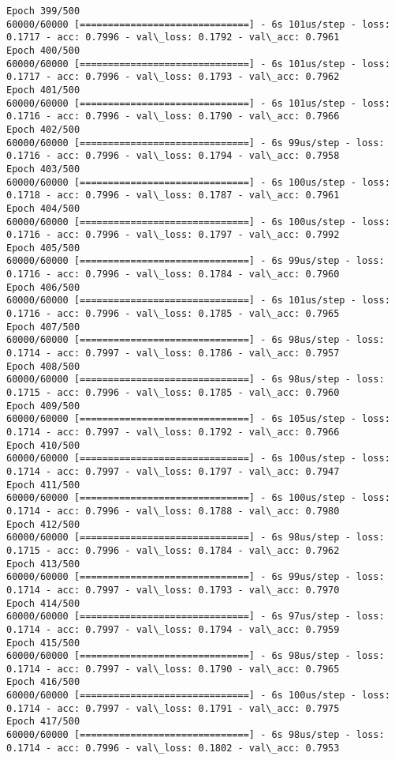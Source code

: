 \documentclass[11pt]{article}
\begin{document}
\begin{Verbatim}[commandchars=\\\{\}]
Epoch 399/500
60000/60000 [==============================] - 6s 101us/step - loss: 0.1717 - acc: 0.7996 - val\_loss: 0.1792 - val\_acc: 0.7961
Epoch 400/500
60000/60000 [==============================] - 6s 101us/step - loss: 0.1717 - acc: 0.7996 - val\_loss: 0.1793 - val\_acc: 0.7962
Epoch 401/500
60000/60000 [==============================] - 6s 101us/step - loss: 0.1716 - acc: 0.7996 - val\_loss: 0.1790 - val\_acc: 0.7966
Epoch 402/500
60000/60000 [==============================] - 6s 99us/step - loss: 0.1716 - acc: 0.7996 - val\_loss: 0.1794 - val\_acc: 0.7958
Epoch 403/500
60000/60000 [==============================] - 6s 100us/step - loss: 0.1718 - acc: 0.7996 - val\_loss: 0.1787 - val\_acc: 0.7961
Epoch 404/500
60000/60000 [==============================] - 6s 100us/step - loss: 0.1716 - acc: 0.7996 - val\_loss: 0.1797 - val\_acc: 0.7992
Epoch 405/500
60000/60000 [==============================] - 6s 99us/step - loss: 0.1716 - acc: 0.7996 - val\_loss: 0.1784 - val\_acc: 0.7960
Epoch 406/500
60000/60000 [==============================] - 6s 101us/step - loss: 0.1716 - acc: 0.7996 - val\_loss: 0.1785 - val\_acc: 0.7965
Epoch 407/500
60000/60000 [==============================] - 6s 98us/step - loss: 0.1714 - acc: 0.7997 - val\_loss: 0.1786 - val\_acc: 0.7957
Epoch 408/500
60000/60000 [==============================] - 6s 98us/step - loss: 0.1715 - acc: 0.7996 - val\_loss: 0.1785 - val\_acc: 0.7960
Epoch 409/500
60000/60000 [==============================] - 6s 105us/step - loss: 0.1714 - acc: 0.7997 - val\_loss: 0.1792 - val\_acc: 0.7966
Epoch 410/500
60000/60000 [==============================] - 6s 100us/step - loss: 0.1714 - acc: 0.7997 - val\_loss: 0.1797 - val\_acc: 0.7947
Epoch 411/500
60000/60000 [==============================] - 6s 100us/step - loss: 0.1714 - acc: 0.7996 - val\_loss: 0.1788 - val\_acc: 0.7980
Epoch 412/500
60000/60000 [==============================] - 6s 98us/step - loss: 0.1715 - acc: 0.7996 - val\_loss: 0.1784 - val\_acc: 0.7962
Epoch 413/500
60000/60000 [==============================] - 6s 99us/step - loss: 0.1714 - acc: 0.7997 - val\_loss: 0.1793 - val\_acc: 0.7970
Epoch 414/500
60000/60000 [==============================] - 6s 97us/step - loss: 0.1714 - acc: 0.7997 - val\_loss: 0.1794 - val\_acc: 0.7959
Epoch 415/500
60000/60000 [==============================] - 6s 98us/step - loss: 0.1714 - acc: 0.7997 - val\_loss: 0.1790 - val\_acc: 0.7965
Epoch 416/500
60000/60000 [==============================] - 6s 100us/step - loss: 0.1714 - acc: 0.7997 - val\_loss: 0.1791 - val\_acc: 0.7975
Epoch 417/500
60000/60000 [==============================] - 6s 98us/step - loss: 0.1714 - acc: 0.7996 - val\_loss: 0.1802 - val\_acc: 0.7953

\end{Verbatim}
\end{document}
